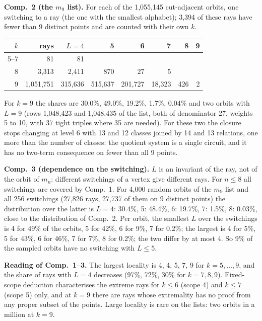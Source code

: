 \documentclass[11pt,a4paper]{article}
\theoremstyle{definition}
\theoremstyle{remark}
\newcommand{\comp}[1]{\medskip\noindent\textbf{#1}}
\begin{document}
\comp{Comp.~2 (the $m_9$ list).} For each of the 1,055,145 cut-adjacent orbits, one switching to a ray (the one with the
smallest alphabet); 3,394 of these rays have fewer than 9 distinct points and are counted with their own $k$.
\begin{center}
\begin{tabular}{rrrrrrrr}
\toprule
$k$ & rays & $L = 4$ & 5 & 6 & 7 & 8 & 9 \\
\midrule
5--7 & 81 & 81 & & & & & \\
8 & 3,313 & 2,411 & 870 & 27 & 5 & & \\
9 & 1,051,751 & 315,636 & 515,637 & 201,727 & 18,323 & 426 & 2 \\
\bottomrule
\end{tabular}
\end{center}
For $k = 9$ the shares are 30.0\%, 49.0\%, 19.2\%, 1.7\%, 0.04\% and two orbits with $L = 9$ (rows 1,048,423 and
1,048,435 of the list, both of denominator 27, weights 5 to 10, with 37 tight triples where 35 are needed). For
these two the closure stops changing at level 6 with 13 and 12 classes joined by 14 and 13 relations, one more than
the number of classes: the quotient system is a single circuit, and it has no two-term consequence on fewer than
all 9 points.

\comp{Comp.~3 (dependence on the switching).} $L$ is an invariant of the ray, not of the orbit of $m_n$: different
switchings of a vertex give different rays. For $n \le 8$ all switchings are covered by Comp.~1. For 4,000 random orbits
of the $m_9$ list and all 256 switchings (27,826 rays, 27,737 of them on 9 distinct points) the distribution over
the latter is $L = 4$: 30.4\%, 5: 48.4\%, 6: 19.7\%, 7: 1.5\%, 8: 0.03\%, close to the distribution of Comp.~2. Per
orbit, the smallest $L$ over the switchings is 4 for 49\% of the orbits, 5 for 42\%, 6 for 9\%, 7 for 0.2\%; the
largest is 4 for 5\%, 5 for 43\%, 6 for 46\%, 7 for 7\%, 8 for 0.2\%; the two differ by at most 4. So 9\% of the
sampled orbits have no switching with $L \le 5$.

\comp{Reading of Comp.~1--3.} The largest locality is 4, 4, 5, 7, 9 for $k = 5, \dots, 9$, and the share of rays with
$L = 4$ decreases (97\%, 72\%, 30\% for $k = 7, 8, 9$). Fixed-scope deduction characterises the extreme rays for
$k \le 6$ (scope 4) and $k \le 7$ (scope 5) only, and at $k = 9$ there are rays whose extremality has no proof from
any proper subset of the points. Large locality is rare on the lists: two orbits in a million at $k = 9$.
\end{document}
